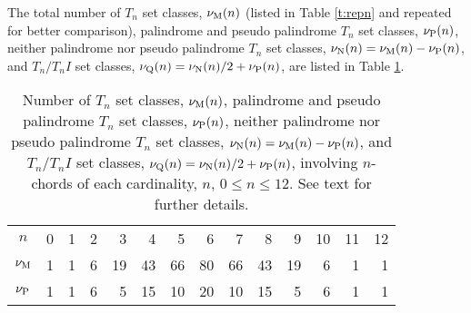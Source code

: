 \documentclass[12pt,a4paper]{article}
\begin{document}
The total number of $T_n$ set classes, $\nu_{\rm M}(n)$ (listed in Table
\ref{t:repn} and repeated for better comparison), palindrome and pseudo
palindrome $T_n$ set classes, $\nu_{\rm P}(n)$, neither palindrome nor pseudo
palindrome $T_n$ set classes, $\nu_{\rm N}(n)=\nu_{\rm M}(n)-\nu_{\rm P}(n)$,
and $T_n/T_nI$ set classes, $\nu_{\rm Q}(n)=\nu_{\rm N}(n)/2+\nu_{\rm P}(n)$,
are listed in Table \ref{t:TTI}.
%
\begin{table}
\caption{Number of $T_n$ set classes, $\nu_{\rm M}(n)$, palindrome and pseudo
palindrome $T_n$ set classes, $\nu_{\rm P}(n)$, neither palindrome nor pseudo
palindrome $T_n$ set classes, $\nu_{\rm N}(n)=\nu_{\rm M}(n)-\nu_{\rm P}(n)$,
and $T_n/T_nI$ set classes, $\nu_{\rm Q}(n)=\nu_{\rm N}(n)/2+\nu_{\rm P}(n)$,
involving $n$-chords of each cardinality, $n$, $0\le n\le12$.   See text for
further details.}
\label{t:TTI}
\begin{center}
\begin{tabular}{|c|r|r|r|r|r|r|r|r|r|r|r|r|r|} \hline
\hline
$n$                   & \phantom{$$}0          & 1 &  2                  &  3                  &   4                  &   5 &   6 &   7 &   8                  &   9                 & 10                  & 11 & 12                     \\
$\nu_{\rm M}$         & \phantom{$$}1          & 1 &  6                  & 19                  &  43                  &  66 &  80 &  66 &  43                  &  19                 &  6                  &  1 &  1                     \\
$\nu_{\rm P}$         & \phantom{$$}1          & 1 &  6                  &  5                  &  15                  &  10 &  20 &  10 &  15                  &   5                 &  6                  &  1 &  1                     \\

\end{tabular}
\end{center}
\end{table}
\end{document}
